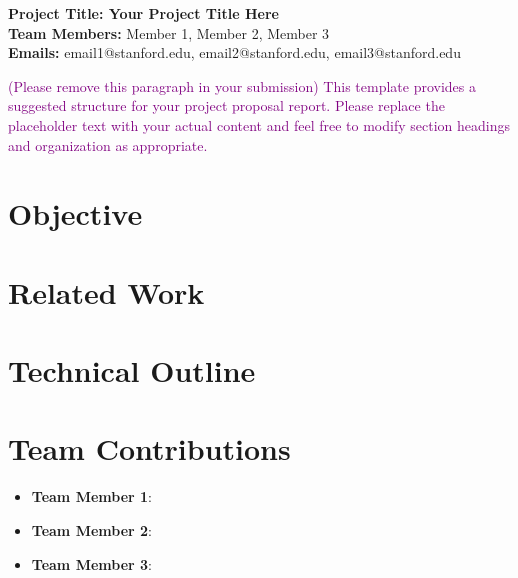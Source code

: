 \documentclass{article}
\makeatletter
\renewcommand{\maketitle}{
  \begin{center}
    {\bf \large Project Title: Your Project Title Here}\\
    \vspace{0.1cm}
    {\bf Team Members:} Member 1, Member 2, Member 3\\
    \vspace{0.1cm}
    {\bf Emails:} email1@stanford.edu, email2@stanford.edu, email3@stanford.edu\\
    \vspace{0.2cm}
  \end{center}
}
\makeatother
\begin{document}
\maketitle

\textcolor{purple}{(Please remove this paragraph in your submission) This template provides a suggested structure for your project proposal report. Please replace the placeholder text with your actual content and feel free to modify section headings and organization as appropriate.}

\section{Objective} %
\lipsum[1][1-25] %

\section{Related Work} %
\lipsum[2-4] %

\section{Technical Outline} %
\lipsum[5-8] %

\section{Team Contributions} %
\begin{itemize}
    \item \textbf{Team Member 1}: \lipsum[6][1-3]
    \item \textbf{Team Member 2}: \lipsum[6][4-6]
    \item \textbf{Team Member 3}: \lipsum[6][7-9]
\end{itemize}

\lipsum[7][1-2] %




%
\end{document}
